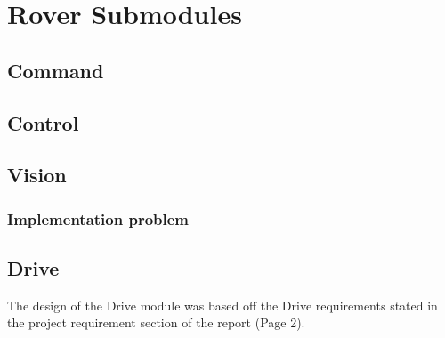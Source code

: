 \documentclass[11pt, a4paper]{article}
\begin{document}
\pagebreak



\pagebreak
\section{Rover Submodules}

\subsection{Command}


\pagebreak
\subsection{Control}




\pagebreak
\subsection{Vision}



\subsubsection{Implementation problem}


\pagebreak
\subsection{Drive}
The design of the Drive module was based off the Drive requirements stated in the project requirement section of the report (Page 2). 
\end{document}

